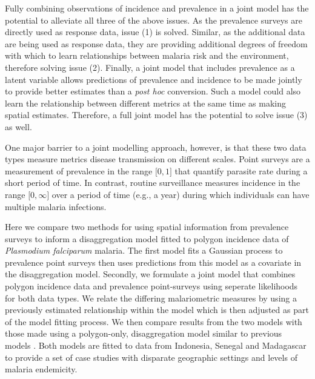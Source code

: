 \documentclass[10pt,letterpaper]{article}
\begin{document}
Fully combining observations of incidence and prevalence in a joint model has the potential to alleviate all three of the above issues.
As the prevalence surveys are directly used as response data, issue (1) is solved.
Similar, as the additional data are being used as response data, they are providing additional degrees of freedom with which to learn relationships between malaria risk and the environment, therefore solving issue (2).
Finally, a joint model that includes prevalence as a latent variable allows predictions of prevalence and incidence to be made jointly to provide better estimates than a \emph{post hoc} conversion.
Such a model could also learn the relationship between different metrics at the same time as making spatial estimates.
Therefore, a full joint model has the potential to solve issue (3) as well.

One major barrier to a joint modelling approach, however, is that these two data types measure metrics disease transmission on different scales.
Point surveys are a measurement of prevalence in the range $\lbrack 0, 1\rbrack$ that quantify parasite rate during a short period of time.
In contrast, routine surveillance measures incidence in the range $\lbrack 0, \infty\rbrack$ over a period of time (e.g., a year) during which individuals can have multiple malaria infections.


Here we compare two methods for using spatial information from prevalence surveys to inform a disaggregation model fitted to polygon incidence data of \emph{Plasmodium falciparum}  malaria.
The first model fits a Gaussian process to prevalence point surveys then uses predictions from this model as a covariate in the disaggregation model.
Secondly, we formulate a joint model that combines polygon incidence data and prevalence point-surveys using seperate likelihoods for both data types.
We relate the differing malariometric measures by using a previously estimated relationship within the model \cite{cameron2015defining} which is then adjusted as part of the model fitting process.
We then compare results from the two models with those made using a polygon-only, disaggregation model similar to previous models \cite{sturrock2014fine, wilson2017pointless}.
Both models are fitted to data from Indonesia, Senegal and Madagascar to provide a set of case studies with disparate geographic settings and levels of malaria endemicity.
\end{document}
